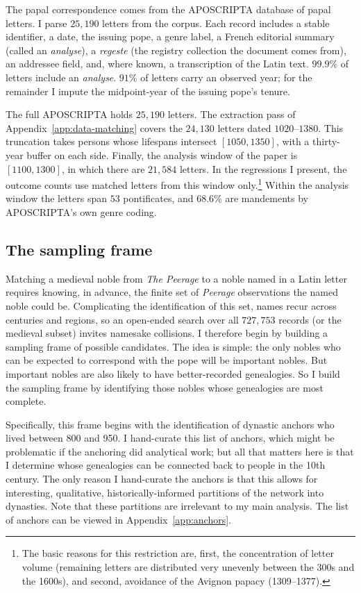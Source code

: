 \documentclass[12pt]{article}
\theoremstyle{definition}
\theoremstyle{remark}
\begin{document}
The papal correspondence comes from the APOSCRIPTA \citep{thery_2019,thery_aposcripta} database of papal letters. I parse $25{,}190$ letters from the corpus. Each record includes a stable identifier, a date, the issuing pope, a genre label, a French editorial summary (called an \emph{analyse}), a \emph{regeste} (the registry collection the document comes from), an addressee field, and, where known, a transcription of the Latin text. $99.9\%$ of letters include an \textit{analyse}. $91\%$ of letters carry an observed year; for the remainder I impute the midpoint-year of the issuing pope's tenure.

The full APOSCRIPTA holds $25{,}190$ letters. The extraction pass of Appendix~\ref{app:data-matching} covers the $24{,}130$ letters dated $1020$--$1380$. This truncation takes persons whose lifespans intersect $[1050,1350]$, with a thirty-year buffer on each side. Finally, the analysis window of the paper is $[1100,1300]$, in which there are $21{,}584$ letters. In the regressions I present, the outcome counts use matched letters from this window only.\footnote{The basic reasons for this restriction are, first, the concentration of letter volume (remaining letters are distributed very unevenly between the 300s and the 1600s), and second, avoidance of the Avignon papacy (1309--1377).} Within the analysis window the letters span $53$ pontificates, and $68.6\%$ are mandements by APOSCRIPTA's own genre coding.

\subsection{The sampling frame}
\label{app:data-frame}

Matching a medieval noble from \textit{The Peerage} to a noble named in a Latin letter requires knowing, in advance, the finite set of \textit{Peerage} observations the named noble could be. Complicating the identification of this set, names recur across centuries and regions, so an open-ended search over all $727{,}753$ records (or the medieval subset) invites namesake collisions. I therefore begin by building a sampling frame of possible candidates. The idea is simple: the only nobles who can be expected to correspond with the pope will be important nobles. But important nobles are also likely to have better-recorded genealogies. So I build the sampling frame by identifying those nobles whose genealogies are most complete.

Specifically, this frame begins with the identification of dynastic anchors who lived between 800 and 950. I hand-curate this list of anchors, which might be problematic if the anchoring did analytical work; but all that matters here is that I determine whose genealogies can be connected back to people in the 10th century. The only reason I hand-curate the anchors is that this allows for interesting, qualitative, historically-informed partitions of the network into dynasties. Note that these partitions are irrelevant to my main analysis. The list of anchors can be viewed in Appendix~\ref{app:anchors}.
\end{document}

